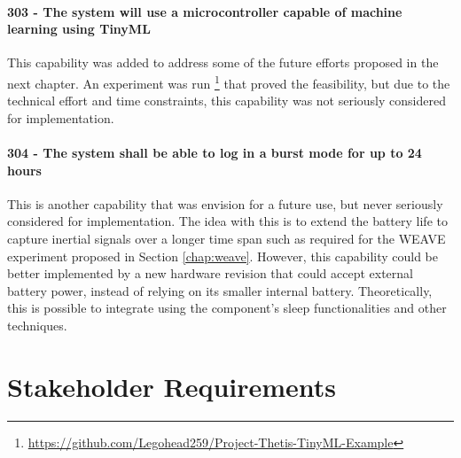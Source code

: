 \paragraph*{303 - The system will use a microcontroller capable of machine learning using TinyML} This capability was added to address some of the future efforts proposed in the next chapter.
An experiment was run \footnote{\url{https://github.com/Legohead259/Project-Thetis-TinyML-Example}} that proved the feasibility, but due to the technical effort and time constraints, this capability was not seriously considered for implementation.

\paragraph*{304 - The system shall be able to log in a burst mode for up to 24 hours} This is another capability that was envision for a future use, but never seriously considered for implementation.
The idea with this is to extend the battery life to capture inertial signals over a longer time span such as required for the WEAVE experiment proposed in Section \ref{chap:weave}.
However, this capability could be better implemented by a new hardware revision that could accept external battery power, instead of relying on its smaller internal battery.
Theoretically, this is possible to integrate using the component's sleep functionalities and other techniques.

\section{Stakeholder Requirements}

